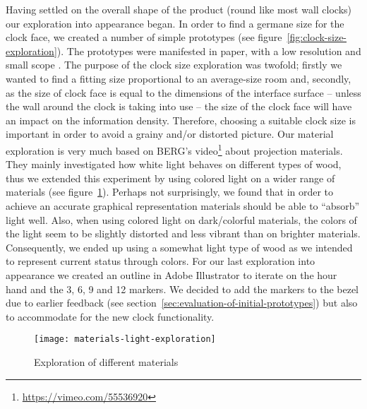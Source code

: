 Having settled on the overall shape of the product (round like most wall clocks) our exploration into appearance began. In order to find a germane size for the clock face, we created a number of simple prototypes (see figure~\ref{fig:clock-size-exploration}). The prototypes were manifested in paper, with a low resolution and small scope \cite[p.~11]{lim2008anatomy}. The purpose of the clock size exploration was twofold; firstly we wanted to find a fitting size proportional to an average-size room and, secondly, as the size of clock face is equal to the dimensions of the interface surface  -- unless the wall around the clock is taking into use -- the size of the clock face will have an impact on the information density. Therefore, choosing a suitable clock size is important in order to avoid a grainy and/or distorted picture. Our material exploration is very much based on BERG’s video\footnote{\url{https://vimeo.com/55536920}} about projection materials. They mainly investigated how white light behaves on different types of wood, thus we extended this experiment by using colored light on a wider range of materials (see figure~\ref{fig:materials-light-exploration}). Perhaps not surprisingly, we found that in order to achieve an accurate graphical representation materials should be able to “absorb” light well. Also, when using colored light on dark/colorful materials, the colors of the light seem to be slightly distorted and less vibrant than on brighter materials. Consequently, we ended up using a somewhat light type of wood as we intended to represent current status through colors. For our last exploration into appearance we created an outline in Adobe Illustrator to iterate on the hour hand and the 3, 6, 9 and 12 markers. We decided to add the markers to the bezel due to earlier feedback (see section~\ref{sec:evaluation-of-initial-prototypes}) but also to accommodate for the new clock functionality.

\begin{figure}[h]
	\centering
	\texttt{[image: materials-light-exploration]}
	\caption{Exploration of different materials}
	\label{fig:materials-light-exploration}
\end{figure}

